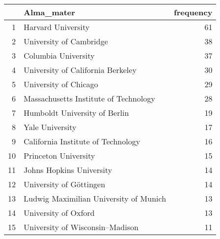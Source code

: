 \begin{table}[ht]
\centering
\begin{tabular}{rlr}
  \hline
 & Alma\_mater & frequency \\ 
  \hline
1 & Harvard University &  61 \\ 
  2 & University of Cambridge &  38 \\ 
  3 & Columbia University &  37 \\ 
  4 & University of California Berkeley &  30 \\ 
  5 & University of Chicago &  29 \\ 
  6 & Massachusetts Institute of Technology &  28 \\ 
  7 & Humboldt University of Berlin &  19 \\ 
  8 & Yale University &  17 \\ 
  9 & California Institute of Technology &  16 \\ 
  10 & Princeton University &  15 \\ 
  11 & Johns Hopkins University &  14 \\ 
  12 & University of Göttingen &  14 \\ 
  13 & Ludwig Maximilian University of Munich &  13 \\ 
  14 & University of Oxford &  13 \\ 
  15 & University of Wisconsin–Madison &  11 \\ 
   \hline
\end{tabular}
\end{table}
